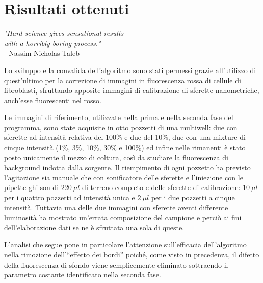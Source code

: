 \clearpage{\pagestyle{empty}\cleardoublepage}

\chapter{Risultati ottenuti}

\begin{flushright}\begin{small}\textit{"Hard science gives sensational results\\ with a horribly boring process."}\\
- Nassim Nicholas Taleb -\\
\end{small}\end{flushright}

Lo sviluppo e la convalida dell'algoritmo sono stati permessi grazie all'utilizzo di quest'ultimo per la correzione di immagini in fluorescenza rossa di cellule di fibroblasti, sfruttando apposite immagini di calibrazione di sferette nanometriche, anch'esse fluorescenti nel rosso.

Le immagini di riferimento, utilizzate nella prima e nella seconda fase del programma, sono state acquisite in otto pozzetti di una multiwell: due con sferette ad intensità relativa del 100\% e due del 10\%, due con una mixture di cinque intensità (1\%, 3\%, 10\%, 30\% e 100\%) ed infine nelle rimanenti è stato posto unicamente il mezzo di coltura, così da studiare la fluorescenza di background indotta dalla sorgente.
Il riempimento di ogni pozzetto ha previsto l'agitazione sia manuale che con sonificatore delle sferette e l'iniezione con le pipette ghilson di $220\ \mu l$ di terreno completo e delle sferette di calibrazione: $10\ \mu l$ per i quattro pozzetti ad intensità unica e $2\ \mu l$ per i due pozzetti a cinque intensità.
Tuttavia una delle due immagini con sferette aventi differente luminosità ha mostrato un'errata composizione del campione e perciò ai fini dell'elaborazione dati se ne è sfruttata una sola di queste.

L'analisi che segue pone in particolare l'attenzione sull'efficacia dell'algoritmo nella rimozione dell'``effetto dei bordi'' poiché, come visto in precedenza, il difetto della fluorescenza di sfondo viene semplicemente eliminato sottraendo il parametro costante identificato nella seconda fase.


